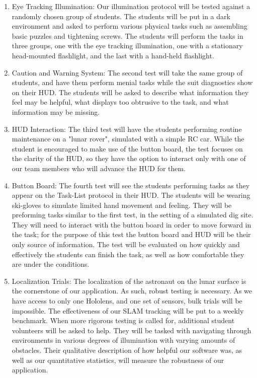 \documentclass{article}
\begin{document}
\begin{enumerate}

\item Eye Tracking Illumination: Our illumination protocol will be tested against a randomly chosen group of students. The students will be put in a dark environment and asked to perform various physical tasks such as assembling basic puzzles and tightening screws. The students will perform the tasks in three groups, one with the eye tracking illumination, one with a stationary head-mounted flashlight, and the last with a hand-held flashlight.

\item Caution and Warning System: The second test will take the same group of students, and have them perform menial tasks while the suit diagnostics show on their HUD. The students will be asked to describe what information they feel may be helpful, what displays too obtrusive to the task, and what information may be missing.

\item HUD Interaction: The third test will have the students performing routine maintenance on a "lunar rover", simulated with a simple RC car. While the student is encouraged to make use of the button board, the test focuses on the clarity of the HUD, so they have the option to interact only with one of our team members who will advance the HUD for them.

\item Button Board: The fourth test will see the students performing tasks as they appear on the Task-List protocol in their HUD. The students will be wearing ski-gloves to simulate limited hand movement and feeling. They will be preforming tasks similar to the first test, in the setting of a simulated dig site. They will need to interact with the button board in order to move forward in the task; for the purpose of this test the button board and HUD will be their only source of information. The test will be evaluated on how quickly and effectively the students can finish the task, as well as how comfortable they are under the conditions.

\item Localization Trials: The localization of the astronaut on the lunar surface is the cornerstone of our application. As such, robust testing is necessary. As we have access to only one Hololens, and one set of sensors, bulk trials will be impossible. The effectiveness of our SLAM tracking will be put to a weekly benchmark. When more rigorous testing is called for, additional student volunteers will be asked to help. They will be tasked with navigating through environments in various degrees of illumination with varying amounts of obstacles. Their qualitative description of how helpful our software was, as well as our quantitative statistics, will measure the robustness of our application.

\end{enumerate}
\end{document}
